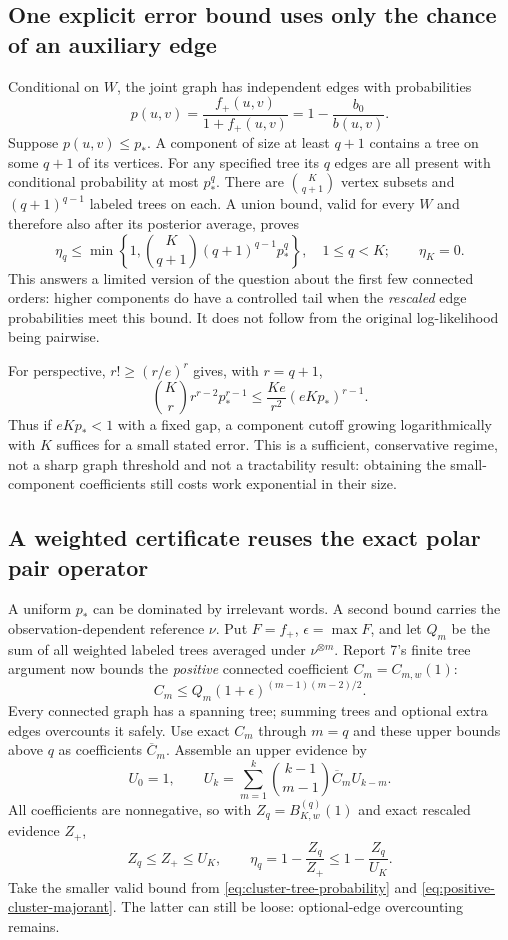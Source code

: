 \documentclass[10pt,a4paper]{article}
\begin{document}
\subsection{One explicit error bound uses only the chance of an auxiliary edge}
Conditional on $W$, the joint graph has independent edges with probabilities
\[
 p(u,v)=\frac{f_+(u,v)}{1+f_+(u,v)}=1-\frac{b_0}{b(u,v)}.
\]
Suppose $p(u,v)\leq p_*$. A component of size at least $q+1$ contains a tree on some $q+1$ of its vertices.
For any specified tree its $q$ edges are all present with conditional probability at most $p_*^q$.
There are $\binom K{q+1}$ vertex subsets and $(q+1)^{q-1}$ labeled trees on each. A union bound,
valid for every $W$ and therefore also after its posterior average, proves
\begin{equation}
 \eta_q\leq
 \min\!\left\{1,\binom K{q+1}(q+1)^{q-1}p_*^q\right\},
 \quad 1\leq q<K;\qquad \eta_K=0.
 \label{eq:cluster-tree-probability}
\end{equation}
This answers a limited version of the question about the first few connected orders: higher components
do have a controlled tail when the \emph{rescaled} edge probabilities meet this bound. It does not follow
from the original log-likelihood being pairwise.

For perspective, $r!\geq(r/e)^r$ gives, with $r=q+1$,
\[
 \binom Kr r^{r-2}p_*^{r-1}
 \leq\frac{Ke}{r^2}(eKp_*)^{r-1}.
\]
Thus if $eKp_*<1$ with a fixed gap, a component cutoff growing logarithmically with $K$ suffices for a
small stated error. This is a sufficient, conservative regime, not a sharp graph threshold and not a
tractability result: obtaining the small-component coefficients still costs work exponential in their size.

\subsection{A weighted certificate reuses the exact polar pair operator}
A uniform $p_*$ can be dominated by irrelevant words. A second bound carries the observation-dependent
reference $\nu$. Put $F=f_+$, $\epsilon=\max F$, and let $Q_m$ be the sum of all weighted labeled trees
averaged under $\nu^{\otimes m}$. Report 7's finite tree argument now bounds the \emph{positive} connected
coefficient $C_m=C_{m,w}(1)$:
\[
 C_m\leq Q_m(1+\epsilon)^{(m-1)(m-2)/2}.
\]
Every connected graph has a spanning tree; summing trees and optional extra edges overcounts it safely.
Use exact $C_m$ through $m=q$ and these upper bounds above $q$ as coefficients $\overline C_m$.
Assemble an upper evidence by
\[
 U_0=1,\qquad U_k=\sum_{m=1}^k\binom{k-1}{m-1}\overline C_m U_{k-m}.
\]
All coefficients are nonnegative, so with $Z_q=B^{(q)}_{K,w}(1)$ and exact rescaled evidence $Z_+$,
\begin{equation}
 Z_q\leq Z_+\leq U_K,\qquad
 \eta_q=1-\frac{Z_q}{Z_+}\leq1-\frac{Z_q}{U_K}.
 \label{eq:positive-cluster-majorant}
\end{equation}
Take the smaller valid bound from \eqref{eq:cluster-tree-probability} and
\eqref{eq:positive-cluster-majorant}. The latter can still be loose: optional-edge overcounting remains.
\end{document}
